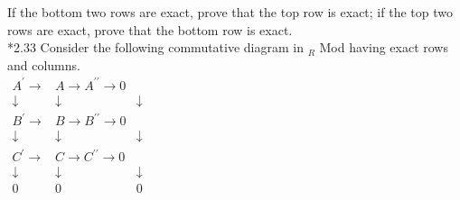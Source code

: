 \documentclass[10pt, letterpaper]{article}
\begin{document}
If the bottom two rows are exact, prove that the top row is exact; if the top two rows are exact, prove that the bottom row is exact.\\
*2.33 Consider the following commutative diagram in ${ }_{R}$ Mod having exact rows and columns.\\
$\begin{array}{ccc}A^{\prime} \longrightarrow & A \longrightarrow A^{\prime \prime} \longrightarrow 0 \\ \downarrow & \downarrow & \downarrow \\ B^{\prime} \longrightarrow & B \longrightarrow B^{\prime \prime} \longrightarrow 0 \\ \downarrow & \downarrow & \downarrow \\ C^{\prime} \longrightarrow & C \longrightarrow C^{\prime \prime} \longrightarrow 0 \\ \downarrow & \downarrow & \downarrow \\ 0 & 0 & 0\end{array}$
\end{document}
